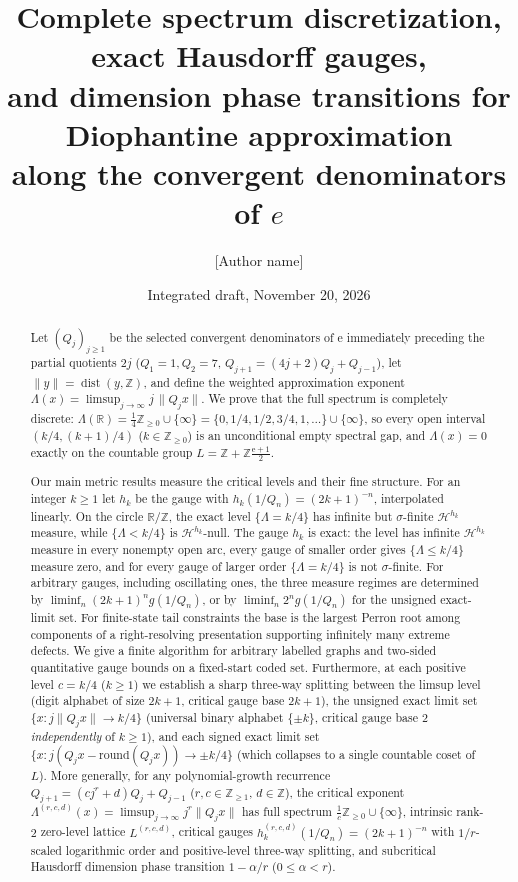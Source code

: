 \documentclass[11pt]{article}
\title{Complete spectrum discretization, exact Hausdorff gauges,\\
and dimension phase transitions for Diophantine approximation\\
along the convergent denominators of \texorpdfstring{$e$}{e}}
\author{[Author name]\\ \relax[Affiliation]}
\date{Integrated draft, November 20, 2026}
\theoremstyle{definition}
\theoremstyle{remark}
\newcommand{\R}{\mathbb{R}}
\newcommand{\Z}{\mathbb{Z}}
\newcommand{\ee}{\mathrm{e}}
\newcommand{\dist}{\operatorname{dist}}
\newcommand{\Lam}{\Lambda}
\begin{document}
\maketitle

\begin{abstract}
Let $(Q_j)_{j\ge1}$ be the selected convergent denominators of $\ee$
immediately preceding the partial quotients $2j$
($Q_1=1,Q_2=7$, $Q_{j+1}=(4j+2)Q_j+Q_{j-1}$), let $\|y\|=\dist(y,\Z)$, and
define the weighted approximation exponent
$\Lam(x)=\limsup_{j\to\infty} j\,\|Q_j x\|$. We prove that the full spectrum is
completely discrete:
$\Lam(\R)=\frac14\Z_{\ge0}\cup\{\infty\}=\{0,1/4,1/2,3/4,1,\dots\}\cup\{\infty\}$,
so every open interval $(k/4,(k+1)/4)$ ($k\in\Z_{\ge0}$) is an unconditional
empty spectral gap, and $\Lam(x)=0$ exactly on the countable group
$L=\Z+\Z\frac{\ee+1}{2}$.

Our main metric results measure the critical levels and their fine structure.
For an integer $k\ge1$ let $h_k$ be the gauge with $h_k(1/Q_n)=(2k+1)^{-n}$,
interpolated linearly. On the circle $\R/\Z$, the exact level $\{\Lam=k/4\}$
has infinite but $\sigma$-finite $\mathcal H^{h_k}$ measure, while
$\{\Lam<k/4\}$ is $\mathcal H^{h_k}$-null. The gauge $h_k$ is exact: the level
has infinite $\mathcal H^{h_k}$ measure in every nonempty open arc, every gauge
of smaller order gives $\{\Lam\le k/4\}$ measure zero, and for every gauge of
larger order $\{\Lam=k/4\}$ is not $\sigma$-finite. For arbitrary gauges,
including oscillating ones, the three measure regimes are determined by
$\liminf_n (2k+1)^n g(1/Q_n)$, or by $\liminf_n 2^n g(1/Q_n)$ for the
unsigned exact-limit set. For finite-state tail constraints the base is
the largest Perron root among components of a right-resolving
presentation supporting infinitely many extreme defects. We give
a finite algorithm for arbitrary labelled graphs and two-sided
quantitative gauge bounds on a fixed-start coded set. Furthermore, at each
positive level $c=k/4$ ($k\ge1$) we establish a sharp three-way splitting
between the limsup level (digit alphabet of size $2k+1$, critical gauge base
$2k+1$), the unsigned exact limit set $\{x:j\|Q_jx\|\to k/4\}$ (universal binary
alphabet $\{\pm k\}$, critical gauge base $2$ \emph{independently} of
$k\ge1$), and each signed exact limit set
$\{x:j(Q_jx-\mathrm{round}(Q_jx))\to\pm k/4\}$ (which collapses to a single
countable coset of $L$). More generally, for any polynomial-growth recurrence
$Q_{j+1}=(cj^r+d)Q_j+Q_{j-1}$ ($r,c\in\Z_{\ge1}$, $d\in\Z$), the critical
exponent $\Lam^{(r,c,d)}(x)=\limsup_{j\to\infty}j^r\|Q_jx\|$ has full
spectrum $\frac1c\Z_{\ge0}\cup\{\infty\}$, intrinsic rank-$2$ zero-level
lattice $L^{(r,c,d)}$, critical gauges $h_k^{(r,c,d)}(1/Q_n)=(2k+1)^{-n}$
with $1/r$-scaled logarithmic order and positive-level three-way splitting, and
subcritical Hausdorff dimension phase transition $1-\alpha/r$ ($0\le\alpha<r$).


\end{abstract}
\end{document}
